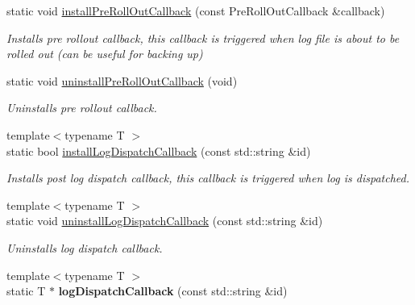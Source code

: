 \begin{DoxyCompactItemize}
\item 
\hypertarget{classel_1_1Helpers_a5fd7ad6d636c28d2e706203d0c43cf8c}{static void \hyperlink{classel_1_1Helpers_a5fd7ad6d636c28d2e706203d0c43cf8c}{install\-Pre\-Roll\-Out\-Callback} (const Pre\-Roll\-Out\-Callback \&callback)}\label{classel_1_1Helpers_a5fd7ad6d636c28d2e706203d0c43cf8c}

\begin{DoxyCompactList}\small\item\em Installs pre rollout callback, this callback is triggered when log file is about to be rolled out (can be useful for backing up) \end{DoxyCompactList}\item 
\hypertarget{classel_1_1Helpers_ab829e5ed1b43bf965f5c288bc0280376}{static void \hyperlink{classel_1_1Helpers_ab829e5ed1b43bf965f5c288bc0280376}{uninstall\-Pre\-Roll\-Out\-Callback} (void)}\label{classel_1_1Helpers_ab829e5ed1b43bf965f5c288bc0280376}

\begin{DoxyCompactList}\small\item\em Uninstalls pre rollout callback. \end{DoxyCompactList}\item 
\hypertarget{classel_1_1Helpers_a3f3e84057567a8ac568a35899318544a}{{\footnotesize template$<$typename T $>$ }\\static bool \hyperlink{classel_1_1Helpers_a3f3e84057567a8ac568a35899318544a}{install\-Log\-Dispatch\-Callback} (const std\-::string \&id)}\label{classel_1_1Helpers_a3f3e84057567a8ac568a35899318544a}

\begin{DoxyCompactList}\small\item\em Installs post log dispatch callback, this callback is triggered when log is dispatched. \end{DoxyCompactList}\item 
\hypertarget{classel_1_1Helpers_ac94b44cc8d399a5842703126478300d7}{{\footnotesize template$<$typename T $>$ }\\static void \hyperlink{classel_1_1Helpers_ac94b44cc8d399a5842703126478300d7}{uninstall\-Log\-Dispatch\-Callback} (const std\-::string \&id)}\label{classel_1_1Helpers_ac94b44cc8d399a5842703126478300d7}

\begin{DoxyCompactList}\small\item\em Uninstalls log dispatch callback. \end{DoxyCompactList}\item 
\hypertarget{classel_1_1Helpers_aa01d59ca141bc75c4fdd78a34234611b}{{\footnotesize template$<$typename T $>$ }\\static T $\ast$ {\bfseries log\-Dispatch\-Callback} (const std\-::string \&id)}\label{classel_1_1Helpers_aa01d59ca141bc75c4fdd78a34234611b}


\end{DoxyCompactItemize}
